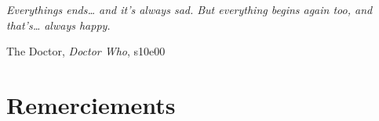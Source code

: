 \documentclass[../main/main.tex]{subfiles}
\begin{document}
\thispagestyle{empty}
\vspace*{\fill}
\epigraph{\openquote\textit{Everythings ends… and it's always sad. But
        everything begins again too, and that's… always happy.
\closequote}}{The Doctor, \textit{Doctor Who}, s10e00}
\vspace*{\fill}

\chapter*{Remerciements}

% 
% 
% 
% 
% 
\end{document}

